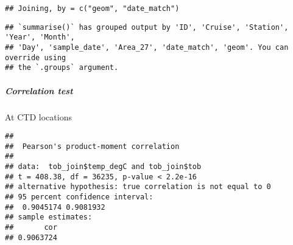\documentclass[
]{article}
\newenvironment{Shaded}{\begin{snugshade}}{\end{snugshade}}
\newcommand{\AttributeTok}[1]{\textcolor[rgb]{0.77,0.63,0.00}{#1}}
\newcommand{\CommentTok}[1]{\textcolor[rgb]{0.56,0.35,0.01}{\textit{#1}}}
\newcommand{\FunctionTok}[1]{\textcolor[rgb]{0.00,0.00,0.00}{#1}}
\newcommand{\NormalTok}[1]{#1}
\newcommand{\OtherTok}[1]{\textcolor[rgb]{0.56,0.35,0.01}{#1}}
\newcommand{\SpecialCharTok}[1]{\textcolor[rgb]{0.00,0.00,0.00}{#1}}
\begin{document}
\begin{verbatim}
## Joining, by = c("geom", "date_match")
\end{verbatim}

\begin{Shaded}
\end{Shaded}

\begin{verbatim}
## `summarise()` has grouped output by 'ID', 'Cruise', 'Station', 'Year', 'Month',
## 'Day', 'sample_date', 'Area_27', 'date_match', 'geom'. You can override using
## the `.groups` argument.
\end{verbatim}

\hypertarget{correlation-test-1}{%
\subparagraph{Correlation test}\label{correlation-test-1}}

At CTD locations

\begin{Shaded}
\end{Shaded}

\begin{verbatim}
## 
##  Pearson's product-moment correlation
## 
## data:  tob_join$temp_degC and tob_join$tob
## t = 408.38, df = 36235, p-value < 2.2e-16
## alternative hypothesis: true correlation is not equal to 0
## 95 percent confidence interval:
##  0.9045174 0.9081932
## sample estimates:
##       cor 
## 0.9063724
\end{verbatim}
\end{document}
